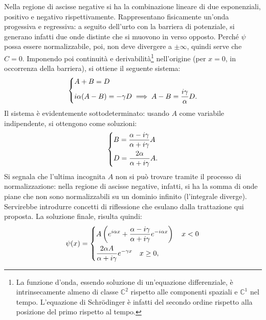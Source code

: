 \documentclass[a4paper,11pt]{report}
\begin{document}
Nella regione di ascisse negative si ha la combinazione lineare di due esponenziali, positivo e negativo rispettivamente. Rappresentano fisicamente un'onda progessiva e regressiva: a seguito dell'urto con la barriera di potenziale, si generano infatti due onde distinte che si muovono in verso opposto. Perché $\psi$ possa essere normalizzabile, poi, non deve divergere a $\pm \infty$, quindi serve che $C = 0$. Imponendo poi continuità e derivabilità\footnote{La funzione d'onda, essendo soluzione di un'equazione differenziale, è intrinsecamente almeno di classe $\mathbb{C}^2$ rispetto alle componenti spaziali e $\mathbb{C}^1$ nel tempo. L'equazione di Schrödinger è infatti del secondo ordine rispetto alla posizione del primo rispetto al tempo.} nell'origine (per $x = 0$, in occorrenza della barriera), si ottiene il seguente sistema:
\begin{equation}
\begin{dcases}
A + B = D  \\
i\alpha( A - B) = -\gamma D \implies A-B = \frac{i\gamma}{\alpha}D.
\end{dcases}
\end{equation}
Il sistema è evidentemente sottodeterminato: usando $A$ come variabile indipendente, si ottengono come soluzioni:
\begin{equation}
\begin{dcases}
B = \frac{\alpha - i\gamma}{\alpha + i\gamma}A \\
D = \frac{2\alpha}{\alpha + i\gamma}A.
\end{dcases}
\end{equation}
Si segnala che l'ultima incognita $A$ non si può trovare tramite il processo di normalizzazione: nella regione di ascisse negative, infatti, si ha la somma di onde piane che non sono normalizzabili su un dominio infinito (l'integrale diverge). Servirebbe introdurre concetti di riflessione che esulano dalla trattazione qui proposta. La soluzione finale, risulta quindi: 
\begin{equation}
\psi(x) =
\begin{dcases}
 A\left(e^{i\alpha x} + \frac{\alpha - i\gamma}{\alpha + i\gamma}e^{-i\alpha x}\right) \quad x < 0 \\
   \frac{2\alpha A}{\alpha + i\gamma}e^{-\gamma x} \quad x \geq 0,
\end{dcases}
\end{equation}
\end{document}
